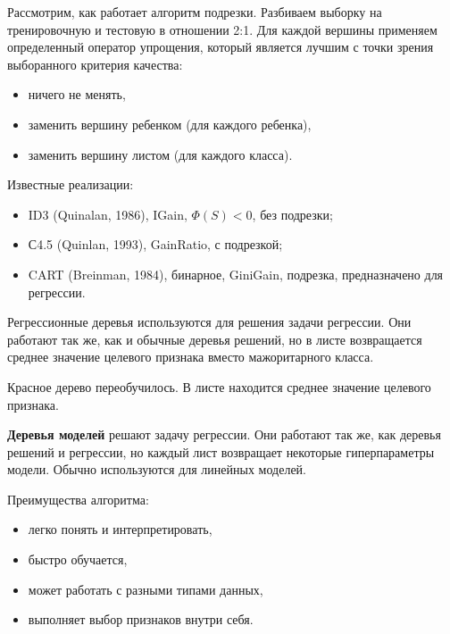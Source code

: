Рассмотрим, как работает алгоритм подрезки. Разбиваем выборку на тренировочную
и тестовую в отношении 2:1. Для каждой вершины применяем определенный оператор
упрощения, который является лучшим с точки зрения выборанного критерия
качества:
\begin{itemize}
    \item ничего не менять,
        
    \item заменить вершину ребенком (для каждого ребенка),

    \item заменить вершину листом (для каждого класса).
\end{itemize}

Известные реализации:
\begin{itemize}
    \item ID3 (Quinalan, 1986), IGain, $\Phi(S) < 0$, без подрезки;
        
    \item С4.5 (Quinlan, 1993), GainRatio, с подрезкой;

    \item CART (Breinman, 1984), бинарное, GiniGain, подрезка, предназначено
        для регрессии.
\end{itemize}

Регрессионные деревья используются для решения задачи регрессии. Они работают
так же, как и обычные деревья решений, но в листе возвращается среднее значение
целевого признака вместо мажоритарного класса.


Красное дерево переобучилось. В листе находится среднее значение целевого
признака.

\textbf{Деревья моделей} решают задачу регрессии. Они работают так же, как
деревья решений и регрессии, но каждый лист возвращает некоторые гиперпараметры
модели. Обычно используются для линейных моделей.

Преимущества алгоритма:
\begin{itemize}
    \item легко понять и интерпретировать,

    \item быстро обучается,

    \item может работать с разными типами данных,

    \item выполняет выбор признаков внутри себя.
\end{itemize}

